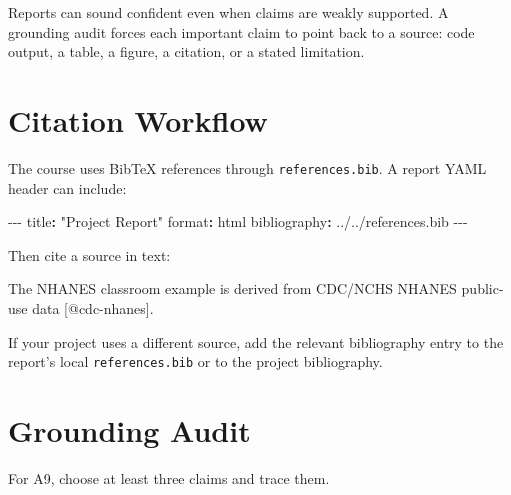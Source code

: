 \documentclass[
  letterpaper,
  DIV=11,
  numbers=noendperiod,
  oneside]{scrreprt}
\newenvironment{Shaded}{\begin{snugshade}}{\end{snugshade}}
\newcommand{\AttributeTok}[1]{\textcolor[rgb]{0.40,0.45,0.13}{#1}}
\newcommand{\CommentTok}[1]{\textcolor[rgb]{0.37,0.37,0.37}{#1}}
\newcommand{\FunctionTok}[1]{\textcolor[rgb]{0.28,0.35,0.67}{#1}}
\newcommand{\KeywordTok}[1]{\textcolor[rgb]{0.00,0.23,0.31}{\textbf{#1}}}
\newcommand{\NormalTok}[1]{\textcolor[rgb]{0.00,0.23,0.31}{#1}}
\newcommand{\OtherTok}[1]{\textcolor[rgb]{0.00,0.23,0.31}{#1}}
\newcommand{\PreprocessorTok}[1]{\textcolor[rgb]{0.68,0.00,0.00}{#1}}
\newcommand{\StringTok}[1]{\textcolor[rgb]{0.13,0.47,0.30}{#1}}
\begin{document}

Reports can sound confident even when claims are weakly supported. A
grounding audit forces each important claim to point back to a source:
code output, a table, a figure, a citation, or a stated limitation.

\section*{Citation Workflow}\label{citation-workflow}


The course uses BibTeX references through \texttt{references.bib}. A
report YAML header can include:

\begin{Shaded}
\begin{Highlighting}[numbers=left,,]
\PreprocessorTok{{-}{-}{-}}
\FunctionTok{title}\KeywordTok{:}\AttributeTok{ }\StringTok{"Project Report"}
\FunctionTok{format}\KeywordTok{:}\AttributeTok{ html}
\FunctionTok{bibliography}\KeywordTok{:}\AttributeTok{ ../../references.bib}
\PreprocessorTok{{-}{-}{-}}
\end{Highlighting}
\end{Shaded}

Then cite a source in text:

\begin{Shaded}
\begin{Highlighting}[numbers=left,,]
\NormalTok{The NHANES classroom example is derived from CDC/NCHS NHANES public{-}use data }\CommentTok{[}\OtherTok{@cdc{-}nhanes}\CommentTok{]}\NormalTok{.}
\end{Highlighting}
\end{Shaded}

If your project uses a different source, add the relevant bibliography
entry to the report's local \texttt{references.bib} or to the project
bibliography.

\section*{Grounding Audit}\label{grounding-audit}


For A9, choose at least three claims and trace them.
\end{document}
